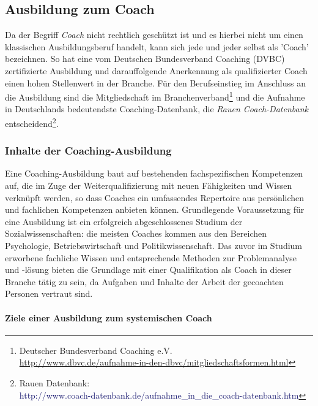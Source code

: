 \documentclass[11pt,a4paper]{article}
\begin{document}
\subsection*{\textsf{Ausbildung zum Coach}}

Da der Begriff \textsl{Coach} nicht rechtlich geschützt ist und es hierbei nicht um einen klassischen Ausbildungsberuf handelt, kann sich jede und jeder selbst als 'Coach' bezeichnen. So hat eine vom Deutschen Bundesverband Coaching (DVBC) zertifizierte Ausbildung und darauffolgende Anerkennung als qualifizierter Coach einen hohen Stellenwert in der Branche. Für den Berufseinstieg im Anschluss an die Ausbildung sind die Mitgliedschaft im Branchenverband\footnote{Deutscher Bundesverband Coaching e.V.\\ \textcolor{MidnightBlue}{\url{http://www.dbvc.de/aufnahme-in-den-dbvc/mitgliedschaftsformen.html}}} und die Aufnahme in Deutschlands bedeutendste Coaching-Datenbank, die \textsl{Rauen Coach-Datenbank} entscheidend\footnote{Rauen Datenbank:\\\textcolor{MidnightBlue}{http://www.coach-datenbank.de/aufnahme\_in\_die\_coach-datenbank.htm}}. 

\subsubsection*{\textsf{Inhalte der Coaching-Ausbildung}}

Eine Coaching-Ausbildung baut auf bestehenden fachspezifischen Kompetenzen auf, die im Zuge der Weiterqualifizierung mit neuen Fähigkeiten und Wissen verknüpft werden, so dass Coaches ein umfassendes Repertoire aus persönlichen und fachlichen Kompetenzen anbieten können. Grundlegende Voraussetzung für eine Ausbildung ist ein erfolgreich abgeschlossenes Studium der Sozialwissenschaften: die meisten Coaches kommen aus den Bereichen Psychologie, Betriebswirtschaft und Politikwissenschaft. Das zuvor im Studium erworbene fachliche Wissen und entsprechende Methoden zur Problemanalyse und -lösung bieten die Grundlage mit einer Qualifikation als Coach in dieser Branche tätig zu sein, da Aufgaben und Inhalte der Arbeit der gecoachten Personen vertraut sind.

\paragraph*{\textsf{Ziele einer Ausbildung zum systemischen Coach}}
\end{document}
